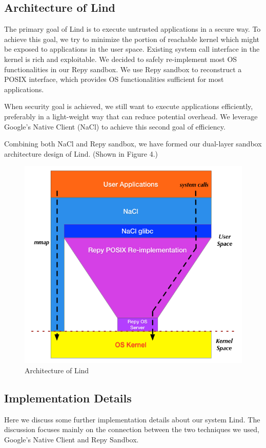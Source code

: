\subsection{Architecture of Lind}
The primary goal of Lind is to execute untrusted applications in a secure way. To achieve this goal, 
we try to minimize the portion of reachable kernel which might be exposed to applications in the user space. 
Existing system call interface in the kernel is rich and exploitable. We decided to safely re-implement most OS
functionalities in our Repy sandbox. We use Repy sandbox to reconstruct a POSIX interface, which provides 
OS functionalities sufficient for most applications. 
   
When security goal is achieved, we still want to execute applications efficiently, preferably in a light-weight 
way that can reduce potential overhead. We leverage Google's Native Client (NaCl) to achieve
this second goal of efficiency.  

Combining both NaCl and Repy sandbox, we have formed our dual-layer sandbox architecture 
design of Lind. (Shown in Figure 4.)  

\begin{figure}[h]
\centering
\includegraphics[width=1.0\columnwidth]{diagram/lind_architecture.png}
\caption{Architecture of Lind}
\label{fig:architecture}
\end{figure}

\subsection{Implementation Details}
Here we discuss some further implementation details about our system Lind. 
The discussion focuses mainly on the connection between the two techniques we used, 
Google's Native Client and Repy Sandbox. 

